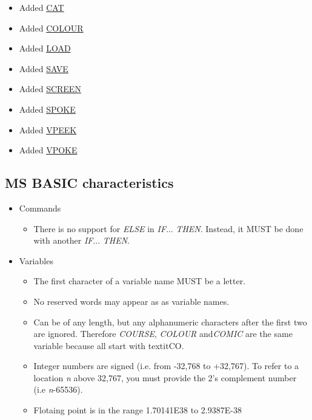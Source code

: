     \begin{itemize}
        \item Added \hyperref[msbasic:lang:cat]{CAT}
        \item Added \hyperref[msbasic:lang:colour]{COLOUR}
        \item Added \hyperref[msbasic:lang:load]{LOAD}
        \item Added \hyperref[msbasic:lang:save]{SAVE}
        \item Added \hyperref[msbasic:lang:screen]{SCREEN}
        \item Added \hyperref[msbasic:lang:spoke]{SPOKE}
        \item Added \hyperref[msbasic:lang:vpeek]{VPEEK}
        \item Added \hyperref[msbasic:lang:vpoke]{VPOKE}
    \end{itemize}

    \subsection{MS BASIC characteristics}

    \begin{itemize}
        \item Commands
        \begin{itemize}
            \item There is no support for \textit{ELSE} in \textit{IF}...
            \textit{THEN}. Instead, it MUST be done with another \textit{IF}...
            \textit{THEN}.
        \end{itemize}
        \item Variables
        \begin{itemize}
            \item The first character of a variable name MUST be a letter.
            \item No reserved words may appear as as variable names.
            \item Can be of any length, but any alphanumeric characters after
            the first two are ignored. Therefore \textit{COURSE},
            \textit{COLOUR} and\textit{COMIC} are the same variable because all
            start with textit{CO}.
            \item Integer numbers are signed (i.e. from -32,768 to +32,767). To
            refer to a location \textit{n} above 32,767, you must provide the
            2's complement number (i.e \textit{n}-65536).
            \item Flotaing point is in the range 1.70141E38 to 2.9387E-38
        \end{itemize}
    \end{itemize}

